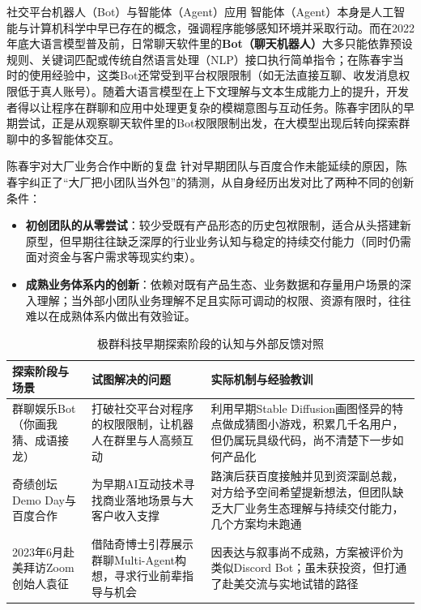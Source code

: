 \documentclass[UTF8,a4paper,11pt,fontset=fandol]{ctexart}
\begin{document}
\begin{knowledgebox}{社交平台机器人（Bot）与智能体（Agent）应用}
智能体（Agent）本身是人工智能与计算机科学中早已存在的概念，强调程序能够感知环境并采取行动。而在2022年底大语言模型普及前，日常聊天软件里的\textbf{Bot（聊天机器人）}大多只能依靠预设规则、关键词匹配或传统自然语言处理（NLP）接口执行简单指令；在陈春宇当时的使用经验中，这类Bot还常受到平台权限限制（如无法直接互聊、收发消息权限低于真人账号）。随着大语言模型在上下文理解与文本生成能力上的提升，开发者得以让程序在群聊和应用中处理更复杂的模糊意图与互动任务。陈春宇团队的早期尝试，正是从观察聊天软件里的Bot权限限制出发，在大模型出现后转向探索群聊中的多智能体交互。
\end{knowledgebox}
\begin{importantbox}{陈春宇对大厂业务合作中断的复盘}
针对早期团队与百度合作未能延续的原因，陈春宇纠正了“大厂把小团队当外包”的猜测，从自身经历出发对比了两种不同的创新条件：
\begin{itemize}
\item \textbf{初创团队的从零尝试}：较少受既有产品形态的历史包袱限制，适合从头搭建新原型，但早期往往缺乏深厚的行业业务认知与稳定的持续交付能力（同时仍需面对资金与客户需求等现实约束）。
\item \textbf{成熟业务体系内的创新}：依赖对既有产品生态、业务数据和存量用户场景的深入理解；当外部小团队业务理解不足且实际可调动的权限、资源有限时，往往难以在成熟体系内做出有效验证。
\end{itemize}
\end{importantbox}
\begin{table}[H]\centering\small
\caption{极群科技早期探索阶段的认知与外部反馈对照}
\begin{tabular}{>{\raggedright\arraybackslash}p{\dimexpr(\linewidth-6\tabcolsep)/3\relax}>{\raggedright\arraybackslash}p{\dimexpr(\linewidth-6\tabcolsep)/3\relax}>{\raggedright\arraybackslash}p{\dimexpr(\linewidth-6\tabcolsep)/3\relax}}
\toprule
探索阶段与场景 & 试图解决的问题 & 实际机制与经验教训\\\midrule
群聊娱乐Bot（你画我猜、成语接龙） & 打破社交平台对程序的权限限制，让机器人在群里与人高频互动 & 利用早期Stable Diffusion画图怪异的特点做成猜图小游戏，积累几千名用户，但仍属玩具级代码，尚不清楚下一步如何产品化\\[4pt]
奇绩创坛Demo Day与百度合作 & 为早期AI互动技术寻找商业落地场景与大客户收入支撑 & 路演后获百度接触并见到资深副总裁，对方给予空间希望提新想法，但团队缺乏大厂业务生态理解与持续交付能力，几个方案均未跑通\\[4pt]
2023年6月赴美拜访Zoom创始人袁征 & 借陆奇博士引荐展示群聊Multi-Agent构想，寻求行业前辈指导与机会 & 因表达与叙事尚不成熟，方案被评价为类似Discord Bot；虽未获投资，但打通了赴美交流与实地试错的路径\\[4pt]
\bottomrule\end{tabular}\end{table}
\end{document}
